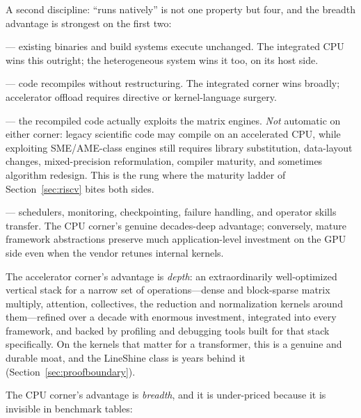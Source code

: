 A second discipline: ``runs natively'' is not one property but four, and the breadth advantage is strongest on the first two:
\begin{description}\itemsep2pt
  \item[Binary/ABI portability] --- existing binaries and build systems execute unchanged. The integrated CPU wins this outright; the heterogeneous system wins it too, on its host side.
  \item[Source portability] --- code recompiles without restructuring. The integrated corner wins broadly; accelerator offload requires directive or kernel-language surgery.
  \item[Performance portability] --- the recompiled code actually exploits the matrix engines. \emph{Not} automatic on either corner: legacy scientific code may compile on an accelerated CPU, while exploiting SME/AME-class engines still requires library substitution, data-layout changes, mixed-precision reformulation, compiler maturity, and sometimes algorithm redesign. This is the rung where the maturity ladder of Section~\ref{sec:riscv} bites both sides.
  \item[Operational portability] --- schedulers, monitoring, checkpointing, failure handling, and operator skills transfer. The CPU corner's genuine decades-deep advantage; conversely, mature framework abstractions preserve much application-level investment on the GPU side even when the vendor retunes internal kernels.
\end{description}

The accelerator corner's advantage is \emph{depth}: an extraordinarily well-optimized vertical stack for a narrow set of operations---dense and block-sparse matrix multiply, attention, collectives, the reduction and normalization kernels around them---refined over a decade with enormous investment, integrated into every framework, and backed by profiling and debugging tools built for that stack specifically. On the kernels that matter for a transformer, this is a genuine and durable moat, and the LineShine class is years behind it (Section~\ref{sec:proofboundary}).

The CPU corner's advantage is \emph{breadth}, and it is under-priced because it is invisible in benchmark tables:

